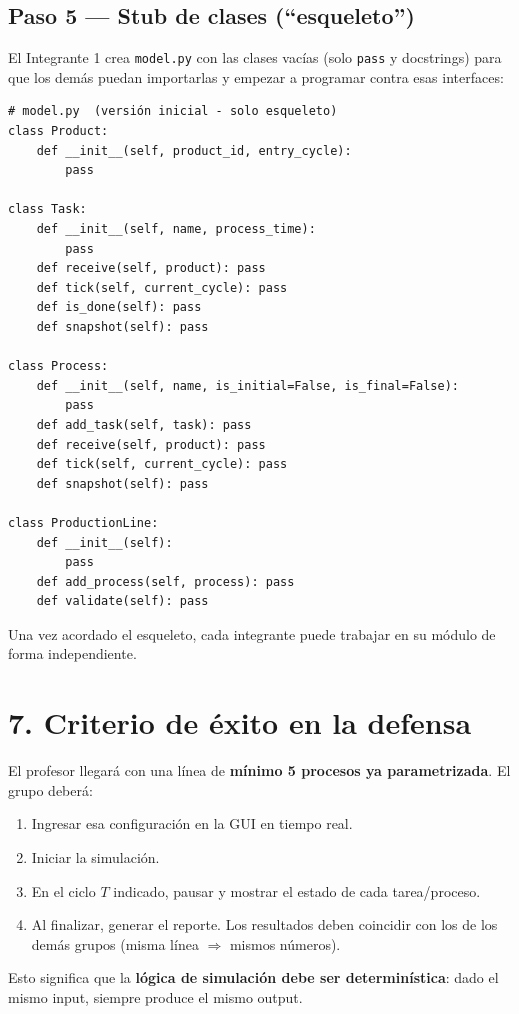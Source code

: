 \documentclass[12pt,letterpaper]{article}
\begin{document}
\subsection*{Paso 5 --- Stub de clases (``esqueleto'')}

El Integrante 1 crea \texttt{model.py} con las clases vacías (solo \texttt{pass} y docstrings) para que los demás puedan importarlas y empezar a programar contra esas interfaces:

\begin{verbatim}
# model.py  (versión inicial - solo esqueleto)
class Product:
    def __init__(self, product_id, entry_cycle):
        pass

class Task:
    def __init__(self, name, process_time):
        pass
    def receive(self, product): pass
    def tick(self, current_cycle): pass
    def is_done(self): pass
    def snapshot(self): pass

class Process:
    def __init__(self, name, is_initial=False, is_final=False):
        pass
    def add_task(self, task): pass
    def receive(self, product): pass
    def tick(self, current_cycle): pass
    def snapshot(self): pass

class ProductionLine:
    def __init__(self):
        pass
    def add_process(self, process): pass
    def validate(self): pass
\end{verbatim}

Una vez acordado el esqueleto, cada integrante puede trabajar en su módulo de forma independiente.

\section*{7. Criterio de éxito en la defensa}

El profesor llegará con una línea de \textbf{mínimo 5 procesos ya parametrizada}. El grupo deberá:
\begin{enumerate}[leftmargin=2em]
    \item Ingresar esa configuración en la GUI en tiempo real.
    \item Iniciar la simulación.
    \item En el ciclo \(T\) indicado, pausar y mostrar el estado de cada tarea/proceso.
    \item Al finalizar, generar el reporte. Los resultados deben coincidir con los de los demás grupos (misma línea $\Rightarrow$ mismos números).
\end{enumerate}

Esto significa que la \textbf{lógica de simulación debe ser determinística}: dado el mismo input, siempre produce el mismo output.
\end{document}
